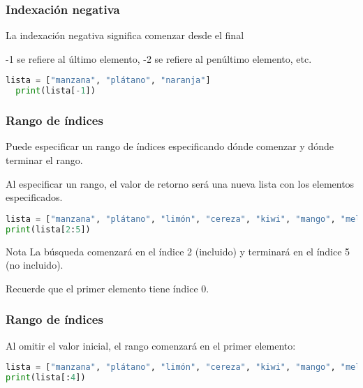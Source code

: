 \begin{frame}[fragile]
  \frametitle{Indexación negativa}

  La indexación negativa significa comenzar desde el final

  \vspace{\baselineskip}
  -1 se refiere al último elemento, -2 se refiere al penúltimo elemento, etc.

  \vspace{\baselineskip}
  \begin{lstlisting}[language=Python]
  lista = ["manzana", "plátano", "naranja"]
  print(lista[-1]) 
  \end{lstlisting}
\end{frame}

\begin{frame}[fragile]
  \frametitle{Rango de índices}

  Puede especificar un rango de índices especificando
  dónde comenzar y dónde terminar el rango.

  \vspace{\baselineskip}
  Al especificar un rango, el valor de retorno será una nueva
  lista con los elementos especificados.

  \vspace{\baselineskip}
  \begin{lstlisting}[language=Python]
lista = ["manzana", "plátano", "limón", "cereza", "kiwi", "mango", "melón"]
print(lista[2:5]) 
  \end{lstlisting}

  \pausa
  \begin{alertblock}{Nota}
    La búsqueda comenzará en el índice 2 (incluido)
    y terminará en el índice 5 (no incluido). 

    Recuerde que el primer elemento tiene índice 0.
  \end{alertblock}
\end{frame}

\begin{frame}[fragile]
  \frametitle{Rango de índices}

  Al omitir el valor inicial, el rango comenzará en el primer elemento: 
  \vspace{\baselineskip}
  \begin{lstlisting}[language=Python]
lista = ["manzana", "plátano", "limón", "cereza", "kiwi", "mango", "melón"]
print(lista[:4]) 
  \end{lstlisting}
\end{frame}

